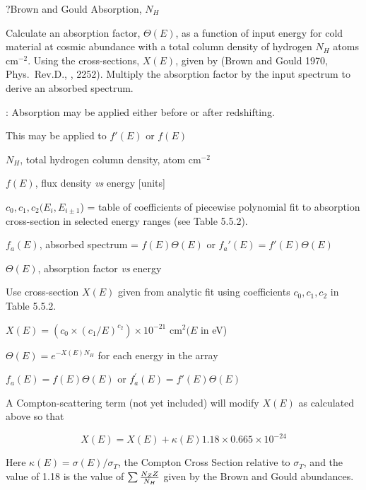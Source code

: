 \par\vfill\eject

\??Brown and Gould Absorption, $N_H$

{\listlist
 

Calculate an absorption factor, $\Theta (E)$, as a function of input energy
for cold material at cosmic abundance with a total column density of hydrogen
$N_H$ atoms cm$^{-2}$.  Using the cross-sections, $X(E)$, given by (Brown and 
Gould 1970, Phys.~Rev.D., , 2252).  Multiply the absorption factor by
the input spectrum to derive an absorbed spectrum.

:  Absorption may be applied either before or after redshifting.
 
This may be applied to $f'(E)$ or $f(E)$


$N_H$, total hydrogen column density, atom cm$^{-2}$

$f(E)$, flux density {\it vs} energy [units]

$c_0, c_1, c_2 (E_i, E_{i\pm1}$) = table of coefficients 
of piecewise polynomial fit to absorption cross-section in selected energy
ranges (see Table 5.5.2).
 

$f_a (E)$, absorbed spectrum = $f(E) \Theta (E)$ or $f_a'(E) = f'(E)\Theta(E)$
 
$\Theta (E)$, absorption factor {\it vs} energy
 
 
Use cross-section $X(E)$ given from analytic fit using 
coefficients $c_0, c_1, c_2$ in Table 5.5.2.

$X(E) = (c_0 \times (c_1/ E )^{c_2}) \times 10^{-21}$ cm$^{2} (E$ in eV)
 
$\Theta(E) = e^{-X(E)N_{H}}$ for each energy in the array
 
$f_{a}(E) = f(E)\Theta(E)$ or $f_{a}^{\prime}(E) = f'(E)\Theta(E)$

}

\vskip 18pt

{\listlist

A Compton-scattering term (not yet included) will modify $X(E)$ as
calculated
above so that

}

$$X(E) = X(E) + \kappa(E) 1.18 \times 0.665 \times 10^{-24}$$

\itemitem{}Here $\kappa(E) = \sigma(E)/\sigma_T$, the Compton Cross Section
relative to $\sigma_T$, and the value of 1.18 is the value of
$\sum {{N_Z Z} \over N_H}$ given by the Brown and Gould abundances.

